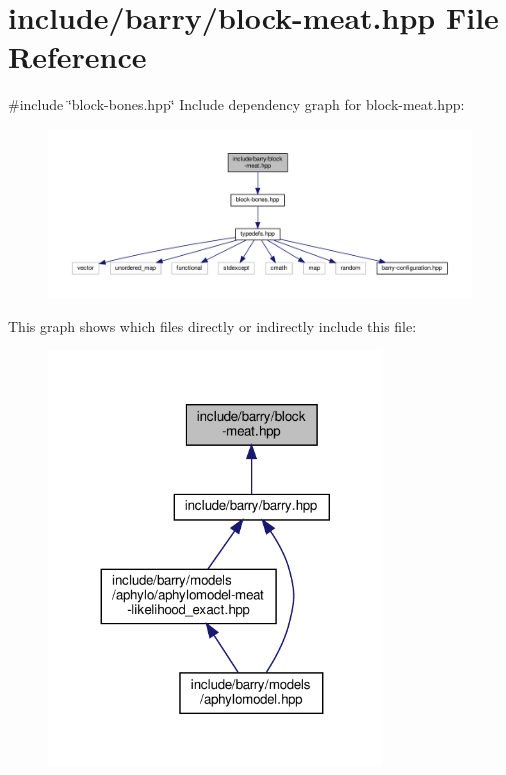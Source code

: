\hypertarget{block-meat_8hpp}{}\section{include/barry/block-\/meat.hpp File Reference}
\label{block-meat_8hpp}
{\ttfamily \#include \char`\"{}block-\/bones.\+hpp\char`\"{}}\newline
Include dependency graph for block-\/meat.hpp\+:\nopagebreak
\begin{figure}[H]
\begin{center}
\leavevmode
\includegraphics[width=350pt]{block-meat_8hpp__incl}
\end{center}
\end{figure}
This graph shows which files directly or indirectly include this file\+:
\nopagebreak
\begin{figure}[H]
\begin{center}
\leavevmode
\includegraphics[width=251pt]{block-meat_8hpp__dep__incl}
\end{center}
\end{figure}
